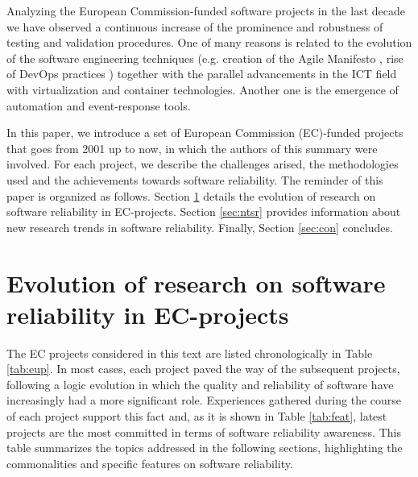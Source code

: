 \documentclass[journal]{IEEEtran}
\begin{document}
Analyzing the European Commission-funded software projects in the last decade
we have observed a continuous increase of the prominence and robustness of
testing and validation procedures. One of many reasons is related to the
evolution of the software engineering techniques (e.g. creation of the Agile
Manifesto \cite{agile-manifesto}, rise of DevOps practices \cite{zhu}) together
with the parallel advancements in the ICT field with virtualization and
container technologies. Another one is the emergence of automation and
event-response tools.

In this paper, we introduce a set of European Commission (EC)-funded projects
that goes from 2001 up to now, in which the authors of this summary were involved.
For each project, we describe the challenges arised, the methodologies used and
the achievements towards software reliability. The reminder of this paper is
organized as follows. Section \ref{sec:ev} details the evolution of research on
software reliability in EC-projects.  Section \ref{sec:ntsr} provides
information about new research trends in software reliability. Finally,
Section \ref{sec:con} concludes.

\section{Evolution of research on software reliability in EC-projects}
\label{sec:ev}

The EC projects considered in this text are listed chronologically in Table
\ref{tab:eup}. In most cases, each project paved the way of the subsequent projects,
following a logic evolution in which the quality and reliability of software have
increasingly had a more significant role. Experiences gathered during the 
course of each project support this fact and, as it is shown in Table \ref{tab:feat},
latest projects are the most committed in terms of software reliability awareness.
This table summarizes the topics addressed in the following sections, highlighting 
the commonalities and specific features on software reliability.
\end{document}
